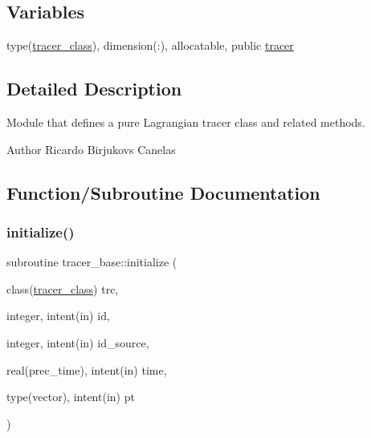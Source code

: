 \subsection*{Variables}
\begin{DoxyCompactItemize}
\item 
type(\mbox{\hyperlink{structtracer__base_1_1tracer__class}{tracer\+\_\+class}}), dimension(\+:), allocatable, public \mbox{\hyperlink{namespacetracer__base_a7f839546575f08e3b944dafdf5e0b2d2}{tracer}}
\end{DoxyCompactItemize}


\subsection{Detailed Description}
Module that defines a pure Lagrangian tracer class and related methods. 

\begin{DoxyAuthor}{Author}
Ricardo Birjukovs Canelas 
\end{DoxyAuthor}


\subsection{Function/\+Subroutine Documentation}
\mbox{\label{namespacetracer__base_ad712d20080a9daa44024d61afae670a4}} 
\subsubsection{\texorpdfstring{initialize()}{initialize()}}
{\footnotesize\ttfamily subroutine tracer\+\_\+base\+::initialize (\begin{DoxyParamCaption}\item[{class(\mbox{\hyperlink{structtracer__base_1_1tracer__class}{tracer\+\_\+class}})}]{trc,  }\item[{integer, intent(in)}]{id,  }\item[{integer, intent(in)}]{id\+\_\+source,  }\item[{real(prec\+\_\+time), intent(in)}]{time,  }\item[{type(vector), intent(in)}]{pt }\end{DoxyParamCaption})\hspace{0.3cm}{\ttfamily [private]}}



